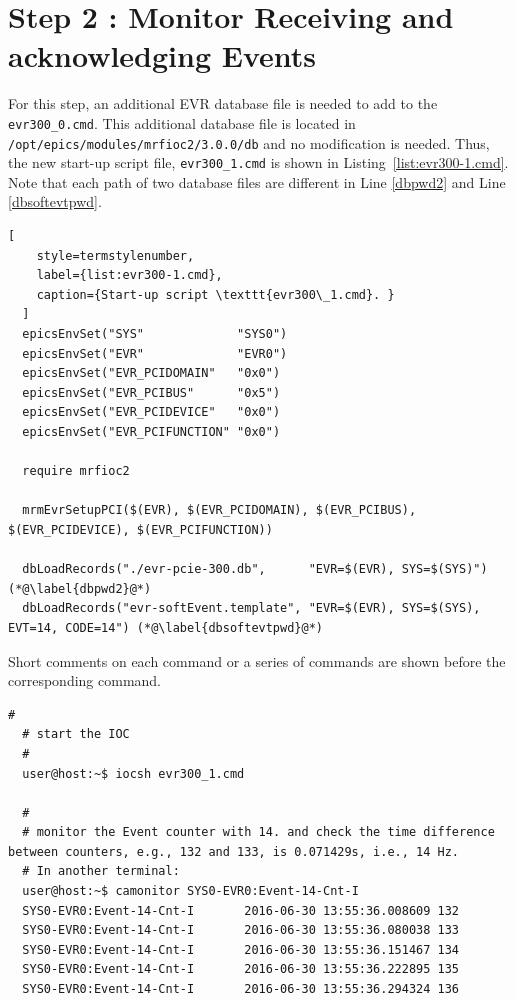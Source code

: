 \documentclass[11pt
  , a4paper
  , article
  , oneside
  , showtrims
]{memoir}
\begin{document}
\section{Step 2 : Monitor Receiving and acknowledging Events}
For this step, an additional EVR database file is needed to add to the \texttt{evr300\_0.cmd}. This additional database file is located in
\texttt{/opt/epics/modules/mrfioc2/3.0.0/db} and no modification is needed. Thus, the new start-up script file, \texttt{evr300\_1.cmd} is shown in Listing~\ref{list:evr300-1.cmd}. Note that each path of two database files are different in Line \ref{dbpwd2} and Line \ref{dbsoftevtpwd}. 
\begin{lstlisting}[
    style=termstylenumber,
    label={list:evr300-1.cmd},
    caption={Start-up script \texttt{evr300\_1.cmd}. }
  ]
  epicsEnvSet("SYS"             "SYS0")
  epicsEnvSet("EVR"             "EVR0")
  epicsEnvSet("EVR_PCIDOMAIN"   "0x0") 
  epicsEnvSet("EVR_PCIBUS"      "0x5") 
  epicsEnvSet("EVR_PCIDEVICE"   "0x0") 
  epicsEnvSet("EVR_PCIFUNCTION" "0x0") 
  
  require mrfioc2
  
  mrmEvrSetupPCI($(EVR), $(EVR_PCIDOMAIN), $(EVR_PCIBUS), $(EVR_PCIDEVICE), $(EVR_PCIFUNCTION))
    
  dbLoadRecords("./evr-pcie-300.db",      "EVR=$(EVR), SYS=$(SYS)") (*@\label{dbpwd2}@*)
  dbLoadRecords("evr-softEvent.template", "EVR=$(EVR), SYS=$(SYS), EVT=14, CODE=14") (*@\label{dbsoftevtpwd}@*)
\end{lstlisting}

Short comments on each command or a series of commands are shown before the corresponding command.

\begin{lstlisting}[style=termstylenumber]
  #
  # start the IOC
  #
  user@host:~$ iocsh evr300_1.cmd

  #
  # monitor the Event counter with 14. and check the time difference between counters, e.g., 132 and 133, is 0.071429s, i.e., 14 Hz.
  # In another terminal:
  user@host:~$ camonitor SYS0-EVR0:Event-14-Cnt-I
  SYS0-EVR0:Event-14-Cnt-I       2016-06-30 13:55:36.008609 132
  SYS0-EVR0:Event-14-Cnt-I       2016-06-30 13:55:36.080038 133
  SYS0-EVR0:Event-14-Cnt-I       2016-06-30 13:55:36.151467 134
  SYS0-EVR0:Event-14-Cnt-I       2016-06-30 13:55:36.222895 135
  SYS0-EVR0:Event-14-Cnt-I       2016-06-30 13:55:36.294324 136
\end{lstlisting}
\end{document}
